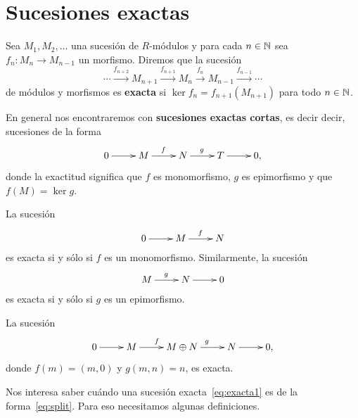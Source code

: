 \chapter{Sucesiones exactas}

\begin{definition}
Sea $M_1,M_2,\dots$ una sucesión de $R$-módulos y para cada $n\in\mathbb{N}$ sea
$f_n\colon M_n\to M_{n-1}$ un morfismo. Diremos que la sucesión
\[
\cdots\xrightarrow{f_{n+2}}M_{n+1}\xrightarrow{f_{n+1}}M_n\xrightarrow{f_n}M_{n-1}\xrightarrow{f_{n-1}}\cdots
\]
de módulos y morfismos 
es \textbf{exacta} si $\ker f_n=f_{n+1}(M_{n+1})$ para todo $n\in\mathbb{N}$. 
\end{definition}

En general nos encontraremos con \textbf{sucesiones exactas cortas}, es decir 
decir, sucesiones de la forma
	\begin{equation}
	\label{eq:exacta1}	
		\xymatrix{
        0\ar[r]
        & M
        \ar[r]^f
        & N
        \ar[r]^g
        & T\ar[r]
        & 0,
        }
  	\end{equation}
donde la exactitud significa que $f$ es monomorfismo, $g$ es epimorfismo y que $f(M)=\ker g$. 


\begin{examples}
La sucesión 
\[
		\xymatrix{
        0\ar[r]
        & M
        \ar[r]^f
        & N
        }
\]
es exacta si y sólo si $f$ es un monomorfismo. Similarmente, la sucesión
\[
		\xymatrix{
        M
        \ar[r]^g
        & N
        \ar[r]
        & 0
        }
\]
es exacta si y sólo si $g$ es un epimorfismo.
\end{examples}

\begin{example}
La sucesión
\begin{equation}
\label{eq:split}
			\xymatrix{
        0\ar[r]
        & M
        \ar[r]^f
        & M\oplus N
        \ar[r]^g
        & N\ar[r]
        & 0,
        }
\end{equation}
donde $f(m)=(m,0)$ y $g(m,n)=n$, es exacta.
\end{example}

Nos interesa saber cuándo una sucesión exacta~\ref{eq:exacta1} es de la forma~\eqref{eq:split}. Para eso
necesitamos algunas definiciones.

